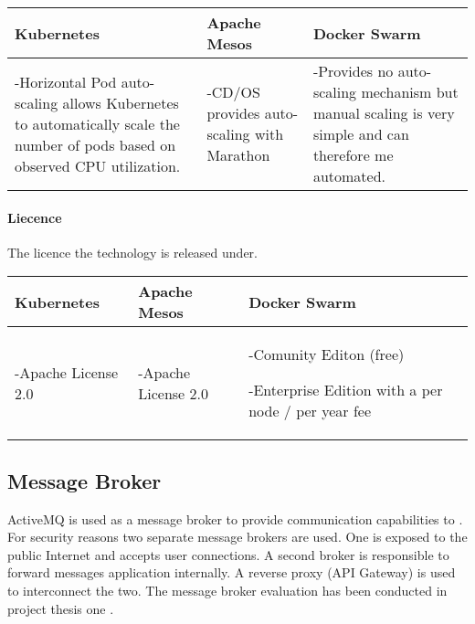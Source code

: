 \begin{center}
  \begin{tabular}{ | p{4.5cm} | p{4.5cm} | p{4.5cm} | }
    \hline
    \textbf{Kubernetes}&\textbf{Apache Mesos}&\textbf{Docker Swarm}\\\hline
    -Horizontal Pod auto-scaling allows Kubernetes to automatically scale the
    number of pods based on observed CPU utilization. & 
    
    -CD/OS provides auto-scaling with Marathon & 
    
    -Provides no auto-scaling mechanism but manual scaling is very simple and
    can therefore me automated.
    \\
    \hline
  \end{tabular}
\end{center}

\paragraph{Liecence}

The licence the technology is released under.

\begin{center}
  \begin{tabular}{ | p{4.5cm} | p{4.5cm} | p{4.5cm} | }
    \hline
    \textbf{Kubernetes}&\textbf{Apache Mesos}&\textbf{Docker Swarm}\\\hline
    -Apache License 2.0 & 
    
    -Apache License 2.0 & 
    
    -Comunity Editon (free) 
    
    -Enterprise Edition with a per node / per year fee\\
    \hline
  \end{tabular}
\end{center}

\subsection{Message Broker}

ActiveMQ is used as a message broker to provide communication capabilities to
\mss{}. For security reasons two separate message brokers are used. One is
exposed to the public Internet and accepts user connections. A second broker is
responsible to forward messages application internally. A reverse proxy (API
Gateway) is used to interconnect the two. The message broker evaluation has been
conducted in project thesis one .


